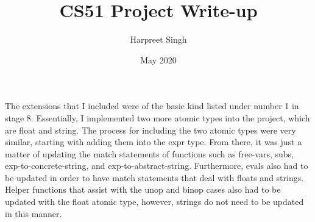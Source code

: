 \documentclass{article}
\title{CS51 Project Write-up}
\author{Harpreet Singh}
\date{May 2020}
\begin{document}
\maketitle

The extensions that I included were of the basic kind listed under number 1 in stage 8. Essentially, I implemented two more atomic types into the project, which are float and string. The process for including the two atomic types were very similar, starting with adding them into the expr type. From there, it was just a matter of updating the match statements of functions such as free-vars, subs, exp-to-concrete-string, and exp-to-abstract-string. Furthermore, evals also had to be updated in order to have match statements that deal with floats and strings. Helper functions that assist with the unop and binop cases also had to be updated with the float atomic type, however, strings do not need to be updated in this manner.
\end{document}
